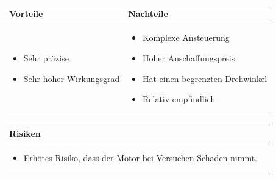 \begin{table}[h]
\begin{tabular}{p{} | p{}}


 \textbf{Vorteile} & \textbf{Nachteile} \\ \hline
	 
\begin{itemize}
\item Sehr präzise
\item Sehr hoher Wirkungsgrad
\end{itemize}

 
 &
 
\begin{itemize}
\item Komplexe Ansteuerung
\item Hoher Anschaffungspreis
\item Hat einen begrenzten Drehwinkel
\item Relativ empfindlich
\end{itemize}

\end{tabular}
\end{table}

\begin{table}[h]
\begin{tabular}{p{}p{}}


 \textbf{Risiken} & \\ \hline
	 
\begin{itemize}
\item Erhötes Risiko, dass der Motor bei Versuchen Schaden nimmt.
\end{itemize}

 
\end{tabular}
\end{table}

\pagebreak